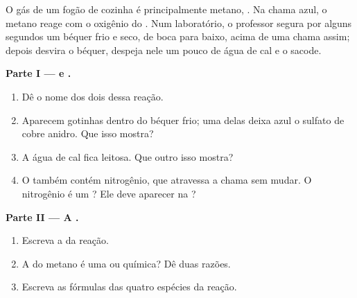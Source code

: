 \begin{problem}
\label{pb:g7:chemical-reactions:1}
O gás de um fogão de cozinha é principalmente metano, . Na chama
azul, o metano reage com o oxigênio do . Num laboratório, o professor
segura por alguns segundos um béquer frio e seco, de boca para baixo,
acima de uma chama assim; depois desvira o béquer, despeja nele um pouco
de água de cal e o sacode.

\medskip
\noindent\textbf{Parte I ---  e .}
\begin{enumerate}
  \item Dê o nome dos dois  dessa reação.
  \item Aparecem gotinhas dentro do béquer frio; uma delas deixa azul o
        sulfato de cobre anidro. Que  isso mostra?
  \item A água de cal fica leitosa. Que outro  isso mostra?
  \item O  também contém nitrogênio, que atravessa a chama sem mudar.
        O nitrogênio é um ? Ele deve aparecer na ?
\end{enumerate}

\medskip
\noindent\textbf{Parte II --- A .}
\begin{enumerate}[resume]
  \item Escreva a  da reação.
  \item A  do metano é uma  ou química? Dê
        duas razões.
  \item Escreva as fórmulas das quatro espécies da reação.
\end{enumerate}


\end{problem}
